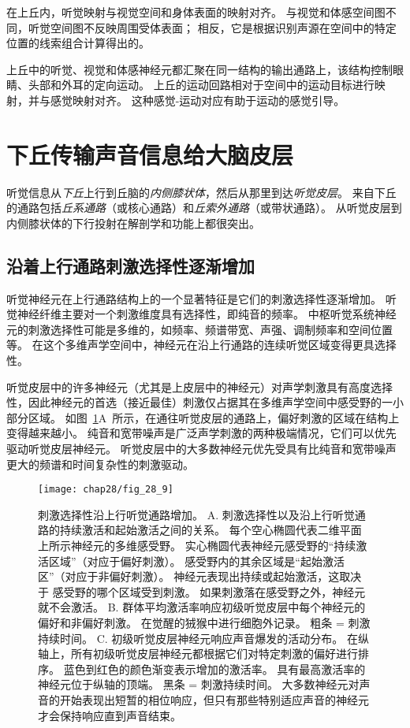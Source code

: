 在上丘内，听觉映射与视觉空间和身体表面的映射对齐。
与视觉和体感空间图不同，听觉空间图不反映周围受体表面；
相反，它是根据识别声源在空间中的特定位置的线索组合计算得出的。


上丘中的听觉、视觉和体感神经元都汇聚在同一结构的输出通路上，该结构控制眼睛、头部和外耳的定向运动。
上丘的运动回路相对于空间中的运动目标进行映射，并与感觉映射对齐。
这种感觉-运动对应有助于运动的感觉引导。



\section{下丘传输声音信息给大脑皮层}

听觉信息从\textit{下丘}上行到丘脑的\textit{内侧膝状体}，然后从那里到达\textit{听觉皮层}。
来自下丘的通路包括\textit{丘系通路}（或核心通路）和\textit{丘索外通路}（或带状通路）。
从听觉皮层到内侧膝状体的下行投射在解剖学和功能上都很突出。



\subsection{沿着上行通路刺激选择性逐渐增加}

听觉神经元在上行通路结构上的一个显著特征是它们的刺激选择性逐渐增加。
听觉神经纤维主要对一个刺激维度具有选择性，即纯音的频率。
中枢听觉系统神经元的刺激选择性可能是多维的，如频率、频谱带宽、声强、调制频率和空间位置等。
在这个多维声学空间中，神经元在沿上行通路的连续听觉区域变得更具选择性。


听觉皮层中的许多神经元（尤其是上皮层中的神经元）对声学刺激具有高度选择性，因此神经元的首选（接近最佳）刺激仅占据其在多维声学空间中感受野的一小部分区域。 
如图~\ref{fig:28_9}A~所示，在通往听觉皮层的通路上，偏好刺激的区域在结构上变得越来越小。
纯音和宽带噪声是广泛声学刺激的两种极端情况，它们可以优先驱动听觉皮层神经元。
听觉皮层中的大多数神经元优先受具有比纯音和宽带噪声更大的频谱和时间复杂性的刺激驱动。


\begin{figure}[htbp]
	\centering
	\texttt{[image: chap28/fig\_28\_9]}
	\caption{刺激选择性沿上行听觉通路增加。
		A. 刺激选择性以及沿上行听觉通路的持续激活和起始激活之间的关系。
		每个空心椭圆代表二维平面上所示神经元的多维感受野。
		实心椭圆代表神经元感受野的“持续激活区域”（对应于偏好刺激）。
		感受野内的其余区域是“起始激活区”（对应于非偏好刺激）。
		神经元表现出持续或起始激活，这取决于 感受野的哪个区域受到刺激。
		如果刺激落在感受野之外，神经元就不会激活\cite{wang2018cortical}。
		B. 群体平均激活率响应初级听觉皮层中每个神经元的偏好和非偏好刺激。
		在觉醒的狨猴中进行细胞外记录。
		粗条 = 刺激持续时间\cite{wang2005sustained}。
		C. 初级听觉皮层神经元响应声音爆发的活动分布。
		在纵轴上，所有初级听觉皮层神经元都根据它们对特定刺激的偏好进行排序。
		蓝色到红色的颜色渐变表示增加的激活率。
		具有最高激活率的神经元位于纵轴的顶端。
		黑条 = 刺激持续时间。
		大多数神经元对声音的开始表现出短暂的相位响应，但只有那些特别适应声音的神经元才会保持响应直到声音结束\cite{middlebrooks2005auditory}。 }
	\label{fig:28_9}
\end{figure}


